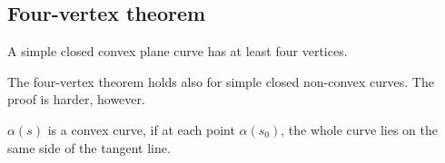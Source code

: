 \subsection{Four-vertex theorem}
\begin{theorem}\label{thm:four-vertex theorem}
    A simple closed convex plane curve has at least four vertices.
\end{theorem}
\begin{remark}
    The four-vertex theorem holds also for simple closed non-convex curves.
    The proof is harder, however.
\end{remark}
\begin{definition}
    $\alpha(s)$ is a convex curve, if at each point $\alpha(s_0)$, the whole curve lies on the same side of the tangent line.
\end{definition}





